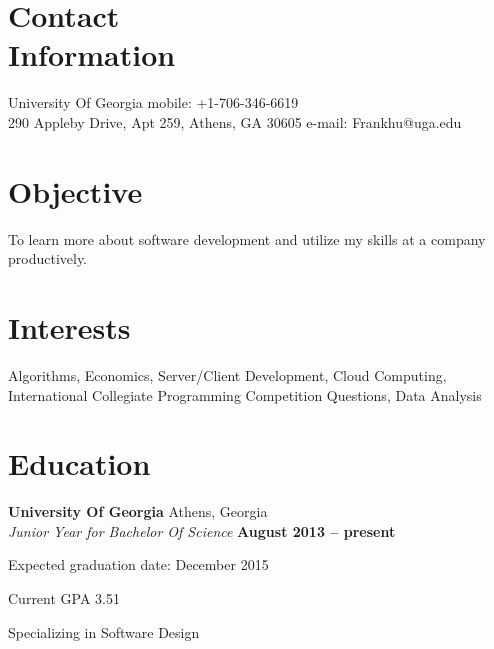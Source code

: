 \documentclass[margin,line]{resume}
\begin{document}
\begin{resume}

    \section{\mysidestyle Contact\\Information}

   	University Of Georgia      \hfill mobile: +1-706-346-6619          \vspace{0mm}\\\vspace{0mm}%
   290 Appleby Drive, Apt 259, Athens, GA 30605 \hfill e-mail: Frankhu@uga.edu \vspace{0mm}\\\vspace{-4.5mm}%

  \section{\mysidestyle Objective}

    To learn more about software development and utilize my skills at a company productively. 

    \section{\mysidestyle Interests}

    Algorithms, Economics, Server/Client Development, Cloud Computing, International Collegiate Programming Competition Questions, Data Analysis

    \section{\mysidestyle Education}

    \textbf{University Of Georgia} Athens, Georgia \vspace{2mm}\\\vspace{1mm}%
    \textsl{Junior Year for Bachelor Of Science} \hfill \textbf{ August 2013 -- present}\vspace{-3mm}\\\vspace{-1mm}%
    \begin{list2}
        \item Expected graduation date: December 2015	
        \item  Current GPA 3.51
        \item Specializing in Software Design
    \end{list2}\vspace{-1.5mm}



\end{resume}
\end{document}
